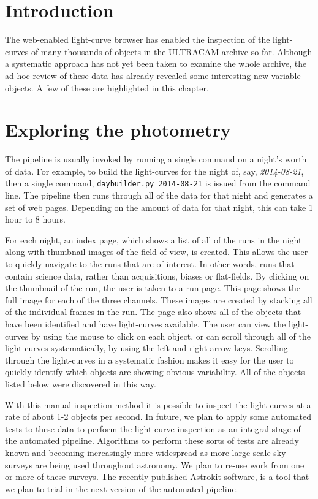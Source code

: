 \section{Introduction}
The web-enabled light-curve browser has enabled the inspection of the light-curves of many thousands of objects in the ULTRACAM archive so far. Although a systematic approach has not yet been taken to examine the whole archive, the ad-hoc review of these data has already revealed some interesting new variable objects. A few of these are highlighted in this chapter. 

\section{Exploring the photometry}
The pipeline is usually invoked by running a single command on a night's worth of data. For example, to build the light-curves for the night of, say, \emph{2014-08-21}, then a single command, \texttt{daybuilder.py 2014-08-21} is issued from the command line. The pipeline then runs through all of the data for that night and generates a set of web pages. Depending on the amount of data for that night, this can take 1 hour to 8 hours. 

For each night, an index page, which shows a list of all of the runs in the night along with thumbnail images of the field of view, is created. This allows the user to quickly navigate to the runs that are of interest. In other words, runs that contain science data, rather than acquisitions, biases or flat-fields. By clicking on the thumbnail of the run, the user is taken to a run page. This page shows the full image for each of the three channels. These images are created by stacking all of the individual frames in the run. The page also shows all of the objects that have been identified and have light-curves available. The user can view the light-curves by using the mouse to click on each object, or can scroll through all of the light-curves systematically, by using the left and right arrow keys. Scrolling through the light-curves in a systematic fashion makes it easy for the user to quickly identify which objects are showing obvious variability. All of the objects listed below were discovered in this way. 

With this manual inspection method it is possible to inspect the light-curves at a rate of about 1-2 objects per second. In future, we plan to apply some automated tests to these data to perform the light-curve inspection as an integral stage of the automated pipeline. Algorithms to perform these sorts of tests are already known and becoming increasingly more widespread as more large scale sky surveys are being used throughout astronomy. We plan to re-use work from one or more of these surveys. The recently published Astrokit software, \citep{Astrokit2014} is a tool that we plan to trial in the next version of the automated pipeline. 

